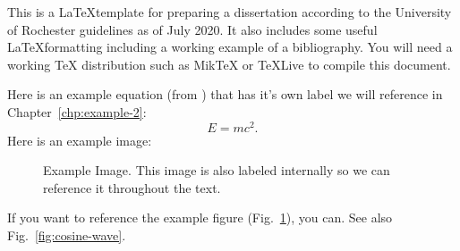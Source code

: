 \documentclass[\main/master.tex]{subfiles}
\begin{document}
\doublespacing
\hspace{5 mm} This is a \LaTeX template for preparing a dissertation according to the University of Rochester guidelines \cite{uofr_guidelines} as of July 2020. It also includes some useful \LaTeX formatting including a working example of a bibliography. You will need a working TeX distribution such as MikTeX \cite{miktex_home} or TeXLive \cite{texlive_nodate} to compile this document.  \par
Here is an example equation (from \cite{einstein1905tragheit} \cite{jordan2015heisenberg} ) that has it's own label we will reference in Chapter~\ref{chp:example-2}:
\begin{equation}
E=mc^{2}.\label{eqn:energy-mass-equivalence-relation}
\end{equation}
Here is an example image:
\begin{figure}[htbp]
	\centering
	\caption[Example Image]{Example Image. This image is also labeled internally so we can reference it throughout the text.}
	\label{fig:sine-wave}
\end{figure}
If you want to reference the example figure (Fig.~\ref{fig:sine-wave}), you can. See also Fig.~\ref{fig:cosine-wave}.
\end{document}
